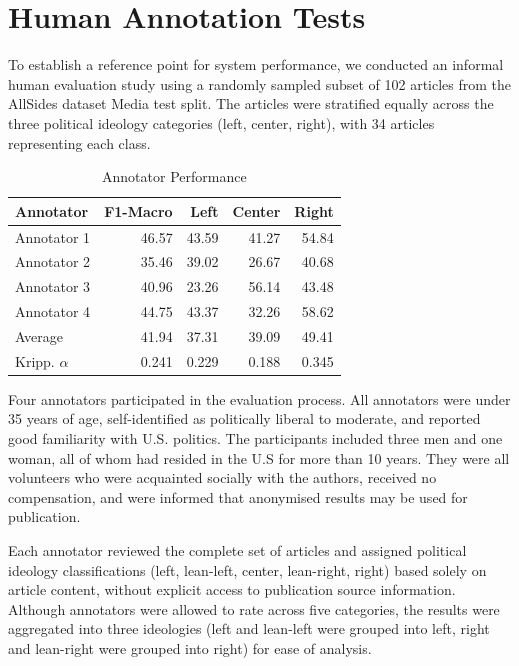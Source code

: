 \chapter{Human Annotation Tests}
\label{sec:appendix-human-tests}

To establish a reference point for system performance, we conducted an informal human evaluation study using a randomly sampled subset of 102 articles from the AllSides dataset Media test split. The articles were stratified equally across the three political ideology categories (left, center, right), with 34 articles representing each class.

\begin{table}[ht]
\centering
\small
\begin{tabular}{lrrrr}
\toprule
\textbf{Annotator}  & \textbf{F1-Macro} & \textbf{Left} & \textbf{Center} & \textbf{Right} \\
\midrule
Annotator 1 & 46.57 & 43.59 & 41.27 & 54.84 \\
Annotator 2 & 35.46 & 39.02 & 26.67 & 40.68 \\
Annotator 3 & 40.96 & 23.26 & 56.14 & 43.48 \\
Annotator 4 & 44.75 & 43.37 & 32.26 & 58.62 \\
\midrule
Average & 41.94 & 37.31 & 39.09 & 49.41 \\
\midrule
Kripp. $\alpha$ & 0.241 & 0.229 & 0.188 & 0.345 \\
\bottomrule
\end{tabular}
\caption{Annotator Performance}
\label{tab:human_baseline}
\end{table}

Four annotators participated in the evaluation process. All annotators were under 35 years of age, self-identified as politically liberal to moderate, and reported good familiarity with U.S. politics. The participants included three men and one woman, all of whom had resided in the U.S for more than 10 years. They were all volunteers who were acquainted socially with the authors, received no compensation, and were informed that anonymised results may be used for publication. 

Each annotator reviewed the complete set of articles and assigned political ideology classifications (left, lean-left, center, lean-right, right) based solely on article content, without explicit access to publication source information. Although annotators were allowed to rate across five categories, the results were aggregated into three ideologies (left and lean-left were grouped into left, right and lean-right were grouped into right) for ease of analysis.

